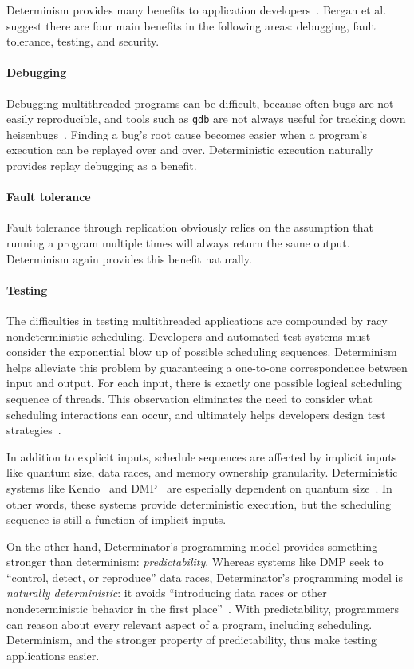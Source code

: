 Determinism provides many benefits to application
developers~\cite{Bergan11,olszewski2009kendo,bocchino2009parallel}. Bergan et
al. suggest there are four main benefits in
the following areas: debugging, fault tolerance, testing, and security.

\paragraph{Debugging} Debugging multithreaded programs can be difficult, because
often bugs are not easily reproducible, and tools such as {\tt gdb} are not
always useful for tracking down heisenbugs~\cite{Musuvathi08}. Finding a bug's
root cause becomes easier when a program's execution can be replayed over and
over. Deterministic execution naturally provides replay debugging as a benefit.

\paragraph{Fault tolerance} Fault tolerance through replication obviously relies
on the assumption that running a program multiple times will always return the
same output. Determinism again provides this benefit naturally.

\paragraph{Testing} The difficulties in testing multithreaded applications are
compounded by racy nondeterministic scheduling. Developers and automated test
systems must consider the exponential blow up of possible scheduling sequences.
Determinism helps alleviate this problem by guaranteeing a one-to-one
correspondence between input and output. For each input, there is exactly one
possible logical scheduling sequence of threads. This observation eliminates the
need to consider what scheduling interactions can occur, and ultimately helps
developers design test strategies~\cite{Bergan11}.

In addition to explicit inputs, schedule sequences are affected by implicit
inputs like quantum size, data races, and memory ownership granularity.
Deterministic systems like Kendo~\cite{olszewski2009kendo} and
DMP~\cite{Devietti09} are especially dependent on quantum size~\cite{Bergan11}.
In other words, these systems provide deterministic execution, but the
scheduling sequence is still a function of implicit inputs.

On the other hand, Determinator's programming model provides something stronger
than determinism: \emph{predictability}. Whereas systems like DMP seek to
``control, detect, or reproduce'' data races, Determinator's programming model
is \emph{naturally deterministic}: it avoids ``introducing data races or other
nondeterministic behavior in the first place''~\cite{Aviram10}. With
predictability, programmers can reason about every relevant aspect of a program,
including scheduling. Determinism, and the stronger property of predictability,
thus make testing applications easier.

